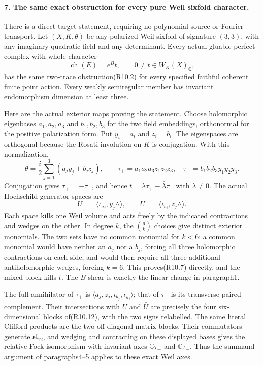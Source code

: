 \paragraph{7. The same exact obstruction for every pure Weil sixfold character.}
There is a direct target statement, requiring no polynomial source
or Fourier transport. Let $(X,K,\theta)$ be any polarized Weil
sixfold of signature $(3,3)$, with any imaginary quadratic field
and any determinant. Every actual gluable perfect complex with
whole character
\[
                \operatorname{ch}(E)=e^Bt,\qquad
                       0\ne t\in W_K(X)_{\mathbb Q},          \tag{R10.17}
\]
has the same two-trace obstruction(R10.2) for every specified
faithful coherent finite point action. Every weakly semiregular
member has invariant endomorphism dimension at least three.

Here are the actual exterior maps proving the statement.
Choose holomorphic eigenbases $a_1,a_2,a_3$ and $b_1,b_2,b_3$
for the two field embeddings, orthonormal for the positive
polarization form. Put $y_i=\bar a_i$ and $z_i=\bar b_i$.
The eigenspaces are orthogonal because the Rosati involution
on $K$ is conjugation. With this normalization,
\[
 \theta=\frac{i}{2}\sum_{j=1}^3(a_jy_j+b_jz_j),\qquad
 \tau_+=a_1a_2a_3z_1z_2z_3,\quad
 \tau_-=b_1b_2b_3y_1y_2y_3.
                                                               \tag{R10.18}
\]
Conjugation gives $\overline{\tau_+}=-\tau_-$, and hence
$t=\lambda\tau_+-\bar\lambda\tau_-$ with $\lambda\ne0$.
The actual Hochschild generator spaces are
\[
 U_-=\langle\iota_{a_j},y_j\wedge\rangle,\qquad
 U_+=\langle\iota_{b_j},z_j\wedge\rangle.                    \tag{R10.19}
\]
Each space kills one Weil volume and acts freely by the indicated
contractions and wedges on the other. In degree $k$, the
$\binom6k$ choices give distinct exterior monomials. The two
sets have no common monomial for $k<6$: a common monomial would
have neither an $a_j$ nor a $b_j$, forcing all three holomorphic
contractions on each side, and would then require all three
additional antiholomorphic wedges, forcing $k=6$.
This proves(R10.7) directly, and the mixed block kills $t$.
The $B$-shear is exactly the linear change in paragraph1.

The full annihilator of $\tau_+$ is
$\langle a_j,z_j,\iota_{b_j},\iota_{y_j}\rangle$; that of
$\tau_-$ is its transverse paired complement. Their
intersections with $U$ and $\bar U$ are precisely the four
six-dimensional blocks of(R10.12), with the two signs relabelled.
The same literal Clifford products are the two off-diagonal
matrix blocks. Their commutators generate $\mathfrak{sl}_{12}$,
and wedging and contracting on these displayed bases gives
the relative Fock isomorphism with invariant axes
$\mathbb C\tau_+$ and $\mathbb C\tau_-$. Thus the summand
argument of paragraphs4--5 applies to these exact Weil axes.

